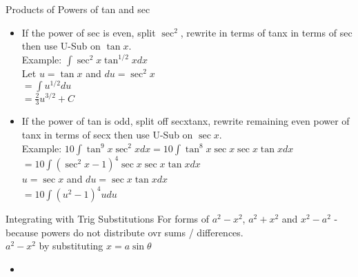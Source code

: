 \documentclass{article}
\begin{document}
\noindent
Products of Powers of tan and sec
\begin{itemize}
  \item If the power of sec is even, split $\sec^2$, rewrite in terms of tanx in terms of sec then use U-Sub on $\tan x$.\\
  Example: $\int{\sec^2x\tan^{1/2}x dx}$\\
  Let $u = \tan{x}$ and $du = \sec^2{x}$\\
  $= \int{u^{1/2}du}$\\
  $= \frac{2}{3}u^{3/2} + C$\\
  \item If the power of tan is odd, split off secxtanx, rewrite remaining even power of tanx in terms of secx then use U-Sub on $\sec{x}$.\\
  Example: $10\int{\tan^9{x}\sec^2{x}dx} = 10\int{\tan^8{x}\sec{x}\sec{x}\tan{x}dx}$\\
  $= 10\int{(\sec^2{x} - 1)^4 \sec{x}\sec{x}\tan{x} dx}$\\
  $u = \sec{x}$ and $du = \sec{x}\tan{x}dx$\\
  $= 10\int{(u^2 - 1)^4 u du}$\\
\end{itemize}

\noindent
\Large
Integrating with Trig Substitutions
\normalsize
\noindent
For forms of $a^2 - x^2$, $a^2 + x^2$ and $x^2 - a^2$ - because powers do not distribute ovr sums / differences.\\
$a^2 - x^2$ by substituting $x = a\sin{\theta}$
\begin{itemize}
  \item
\end{itemize}
\end{document}

